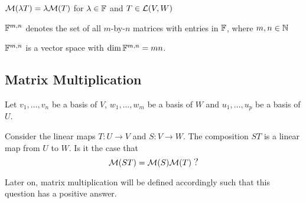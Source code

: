 \setcounter{thm}{37}
\begin{thm}
  $\mathcal{M}(\lambda T) = \lambda \mathcal{M}(T)$ for $\lambda \in \mathbb{F}$ and $T \in \mathcal{L} (V,W)$
\end{thm}

\begin{mydef} 
  $\mathbb{F}^{m,n}$ denotes the set of all $m$-by-$n$ matrices with entries in $\mathbb{F}$, where $m,n \in \mathbb{N}$
\end{mydef}

\begin{thm} %
  \label{thm: the dimension of the vector space of all m by n matrices is mn}
  $\mathbb{F}^{m,n}$ is a vector space with $\dim \mathbb{F}^{m,n}=mn$.
\end{thm}


\subsection{Matrix Multiplication}

Let $v_1, \ldots, v_n$ be a basis of $V$, $w_1, \ldots, w_m$ be a basis of $W$ and $u_1, \ldots, u_p$ be a basis of $U$.

Consider the linear maps $T: U \to V$ and $S: V \to W$. The composition $ST$ is a linear map from $U$ to $W$. Is it the case that
\begin{equation}
  \mmatrix(ST) = \mmatrix(S) \mmatrix(T) \; {\mathlarger ?}
\end{equation}


Later on, matrix multiplication will be defined accordingly such that this question has a positive answer.

